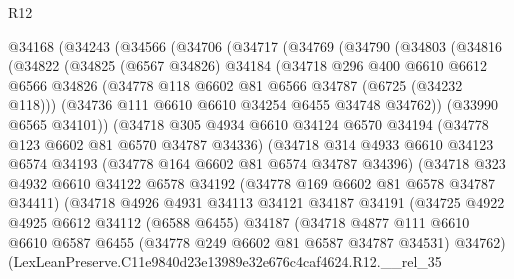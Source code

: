 \begin{lexlean}{R12}
\begin{coremodule}
  @34168
    (@34243
      (@34566
        (@34706
          (@34717
            (@34769
              (@34790
                (@34803
                  (@34816
                    (@34822
                      (@34825
                        (@6567 @34826)
                        @34184
                        (@34718
                          @296
                          @400
                          @6610
                          @6612
                          @6566
                          @34826
                          (@34778 @118 @6602 @81 @6566 @34787 (@6725 (@34232 @118)))
                          (@34736 @111 @6610 @6610 @34254 @6455 @34748 @34762))
                        (@33990 @6565 @34101))
                      (@34718
                        @305
                        @4934
                        @6610
                        @34124
                        @6570
                        @34194
                        (@34778 @123 @6602 @81 @6570 @34787 @34336)
                        (@34718
                          @314
                          @4933
                          @6610
                          @34123
                          @6574
                          @34193
                          (@34778 @164 @6602 @81 @6574 @34787 @34396)
                          (@34718
                            @323
                            @4932
                            @6610
                            @34122
                            @6578
                            @34192
                            (@34778 @169 @6602 @81 @6578 @34787 @34411)
                            (@34718
                              @4926
                              @4931
                              @34113
                              @34121
                              @34187
                              @34191
                              (@34725
                                @4922
                                @4925
                                @6612
                                @34112
                                (@6588 @6455)
                                @34187
                                (@34718
                                  @4877
                                  @111
                                  @6610
                                  @6610
                                  @6587
                                  @6455
                                  (@34778 @249 @6602 @81 @6587 @34787 @34531)
                                  @34762)
                                (LexLeanPreserve.C11e9840d23e13989e32e676c4caf4624.R12.__rel_35

\end{coremodule}
\end{lexlean}
